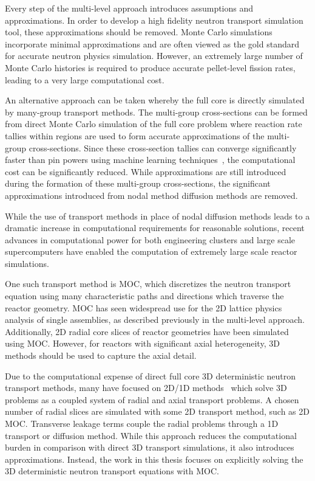 Every step of the multi-level approach introduces assumptions and approximations. In order to develop a high fidelity neutron transport simulation tool, these approximations should be removed. Monte Carlo simulations incorporate minimal approximations and are often viewed as the gold standard for accurate neutron physics simulation. However, an extremely large number of Monte Carlo histories is required to produce accurate pellet-level fission rates, leading to a very large computational cost.

An alternative approach can be taken whereby the full core is directly simulated by many-group transport methods. The multi-group cross-sections can be formed from direct Monte Carlo simulation of the full core problem where reaction rate tallies within regions are used to form accurate approximations of the multi-group cross-sections. Since these cross-section tallies can converge significantly faster than pin powers using machine learning techniques~\cite{boyd2017thesis}, the computational cost can be significantly reduced. While approximations are still introduced during the formation of these multi-group cross-sections, the significant approximations introduced from nodal method diffusion methods are removed.

While the use of transport methods in place of nodal diffusion methods leads to a dramatic increase in computational requirements for reasonable solutions, recent advances in computational power for both engineering clusters and large scale supercomputers have enabled the computation of extremely large scale reactor simulations. 

One such transport method is \ac{MOC}, which discretizes the neutron transport equation using many characteristic paths and directions which traverse the reactor geometry. \ac{MOC} has seen widespread use for the 2D lattice physics analysis of single assemblies, as described previously in the multi-level approach. Additionally, 2D radial core slices of reactor geometries have been simulated using \ac{MOC}. However, for reactors with significant axial heterogeneity, 3D methods should be used to capture the axial detail. 

Due to the computational expense of direct full core 3D deterministic neutron transport methods, many have focused on 2D/1D methods~\cite{2d1d,liu2d1d, tang2d1d, collins2d1d, jarrett2d1d, wenbin2d1d} which solve 3D problems as a coupled system of radial and axial transport problems. A chosen number of radial slices are simulated with some 2D transport method, such as 2D \ac{MOC}. Transverse leakage terms couple the radial problems through a 1D transport or diffusion method. While this approach reduces the computational burden in comparison with direct 3D transport simulations, it also introduces approximations. Instead, the work in this thesis focuses on explicitly solving the 3D deterministic neutron transport equations with \ac{MOC}.

